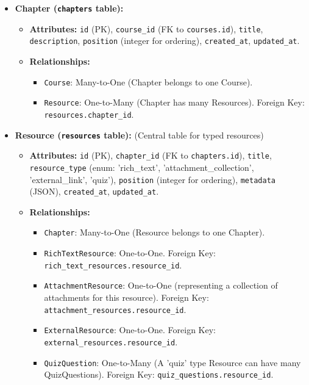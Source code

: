 \documentclass[12pt,a4paper]{article}
\begin{document}
\begin{itemize}
\begin{itemize}
\begin{itemize}
        \end{itemize}
    \end{itemize}
    \item \textbf{Chapter (\texttt{chapters} table):}
    \begin{itemize}
        \item \textbf{Attributes:} \texttt{id} (PK), \texttt{course\_id} (FK to \texttt{courses.id}), \texttt{title}, \texttt{description}, \texttt{position} (integer for ordering), \texttt{created\_at}, \texttt{updated\_at}.
        \item \textbf{Relationships:}
        \begin{itemize}
            \item \texttt{Course}: Many-to-One (Chapter belongs to one Course).
            \item \texttt{Resource}: One-to-Many (Chapter has many Resources). Foreign Key: \texttt{resources.chapter\_id}.
        \end{itemize}
    \end{itemize}
    \item \textbf{Resource (\texttt{resources} table):} (Central table for typed resources)
    \begin{itemize}
        \item \textbf{Attributes:} \texttt{id} (PK), \texttt{chapter\_id} (FK to \texttt{chapters.id}), \texttt{title}, \texttt{resource\_type} (enum: 'rich\_text', 'attachment\_collection', 'external\_link', 'quiz'), \texttt{position} (integer for ordering), \texttt{metadata} (JSON), \texttt{created\_at}, \texttt{updated\_at}.
        \item \textbf{Relationships:}
        \begin{itemize}
            \item \texttt{Chapter}: Many-to-One (Resource belongs to one Chapter).
            \item \texttt{RichTextResource}: One-to-One. Foreign Key: \texttt{rich\_text\_resources.resource\_id}.
            \item \texttt{AttachmentResource}: One-to-One (representing a collection of attachments for this resource). Foreign Key: \texttt{attachment\_resources.resource\_id}.
            \item \texttt{ExternalResource}: One-to-One. Foreign Key: \texttt{external\_resources.resource\_id}.
            \item \texttt{QuizQuestion}: One-to-Many (A 'quiz' type Resource can have many QuizQuestions). Foreign Key: \texttt{quiz\_questions.resource\_id}.

\end{itemize}
\end{itemize}
\end{itemize}
\end{document}
